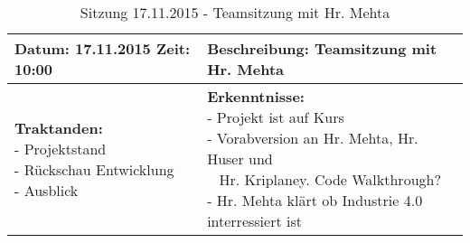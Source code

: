 \begin{table}[H]
\begin{tabularx}{\textwidth}{| l | X |}
\hline
\textbf{Datum:} 17.11.2015
\textbf{Zeit:} 10:00
&
\textbf{Beschreibung:} Teamsitzung mit Hr. Mehta \\ \hline
\specialcell[t]{
\textbf{Traktanden:}\\
- Projektstand\\
- Rückschau Entwicklung\\
- Ausblick\\
}
& 
\specialcell[t]{
\textbf{Erkenntnisse:}\\
- Projekt ist auf Kurs\\
- Vorabversion an Hr. Mehta, Hr. Huser und\\~ Hr. Kriplaney.
Code Walkthrough?\\
- Hr. Mehta klärt ob Industrie 4.0 interressiert ist\\
}
\\ \hline
\end{tabularx}
\caption{Sitzung 17.11.2015 - Teamsitzung mit Hr. Mehta}
\end{table}



